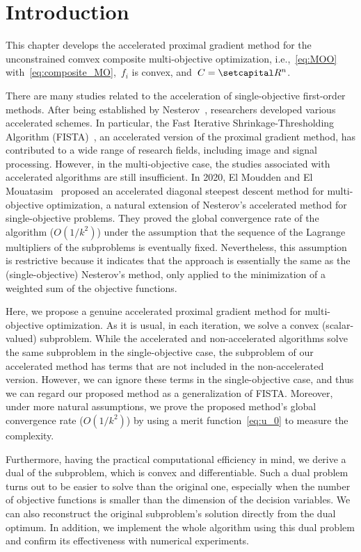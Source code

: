 \documentclass[../main]{subfiles}
\begin{document}
\section{Introduction}
This chapter develops the accelerated proximal gradient method for the unconstrained comvex composite multi-objective optimization, i.e.,~\cref{eq:MOO} with~\cref{eq:composite_MO},~$f_i$ is convex, and~$C = \setR^n$.

There are many studies related to the acceleration of single-objective first-order methods.
After being established by Nesterov~\cite{Nesterov1983}, researchers developed various accelerated schemes.
In particular, the Fast Iterative Shrinkage-Thresholding Algorithm (FISTA)~\cite{Beck2009}, an accelerated version of the proximal gradient method, has contributed to a wide range of research fields, including image and signal processing.
However, in the multi-objective case, the studies associated with accelerated algorithms are still insufficient.
In 2020, El Moudden and El Mouatasim~\cite{ElMoudden2020} proposed an accelerated diagonal steepest descent method for multi-objective optimization, a natural extension of Nesterov's accelerated method for single-objective problems.
They proved the global convergence rate of the algorithm ($O(1 / k^2)$) under the assumption that the sequence of the Lagrange multipliers of the subproblems is eventually fixed.
Nevertheless, this assumption is restrictive because it indicates that the approach is essentially the same as the (single-objective) Nesterov's method, only applied to the minimization of a weighted sum of the objective functions.

Here, we propose a genuine accelerated proximal gradient method for multi-objective optimization.
As it is usual, in each iteration, we solve a convex (scalar-valued) subproblem.
While the accelerated and non-accelerated algorithms solve the same subproblem in the single-objective case, the subproblem of our accelerated method has terms that are not included in the non-accelerated version.
However, we can ignore these terms in the single-objective case, and thus we can regard our proposed method as a generalization of FISTA.
Moreover, under more natural assumptions, we prove the proposed method's global convergence rate ($O(1/k^2)$) by using a merit function~\cref{eq:u_0} to measure the complexity.

Furthermore, having the practical computational efficiency in mind, we derive a dual of the subproblem, which is convex and differentiable.
Such a dual problem turns out to be easier to solve than the original one, especially when the number of objective functions is smaller than the dimension of the decision variables.
We can also reconstruct the original subproblem's solution directly from the dual optimum.
In addition, we implement the whole algorithm using this dual problem and confirm its effectiveness with numerical experiments.
\end{document}
